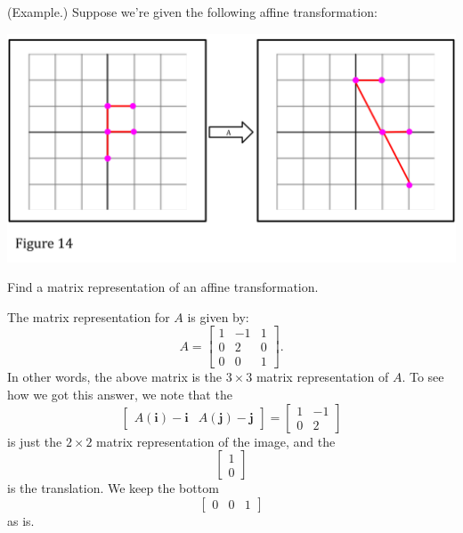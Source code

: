 \documentclass[letterpaper]{article}
\begin{document}
\begin{mdframed}[]
    (Example.) Suppose we're given the following affine transformation:
    \begin{center}
        \includegraphics[scale=0.35]{../assets/f13.png}
    \end{center}
    Find a matrix representation of an affine transformation.

    \begin{mdframed}[]
        The matrix representation for $A$ is given by: 
        \[A = \begin{bmatrix}
            1 & -1 & 1 \\ 
            0 & 2 & 0 \\ 
            0 & 0 & 1
        \end{bmatrix}.\]
        In other words, the above matrix is the $3 \times 3$ matrix representation of $A$. To see how we got this answer, we note that the 
        \[\begin{bmatrix}
            A(\mathbf{i}) - \mathbf{i} & A(\mathbf{j}) - \mathbf{j}
        \end{bmatrix} = \begin{bmatrix}
            1 & -1 \\ 
            0 & 2
        \end{bmatrix}\]
        is just the $2 \times 2$ matrix representation of the image, and the 
        \[\begin{bmatrix}
            1 \\ 0
        \end{bmatrix}\]
        is the translation. We keep the bottom 
        \[\begin{bmatrix}
            0 & 0 & 1
        \end{bmatrix}\]
        as is.
    \end{mdframed}
\end{mdframed}
\end{document}
